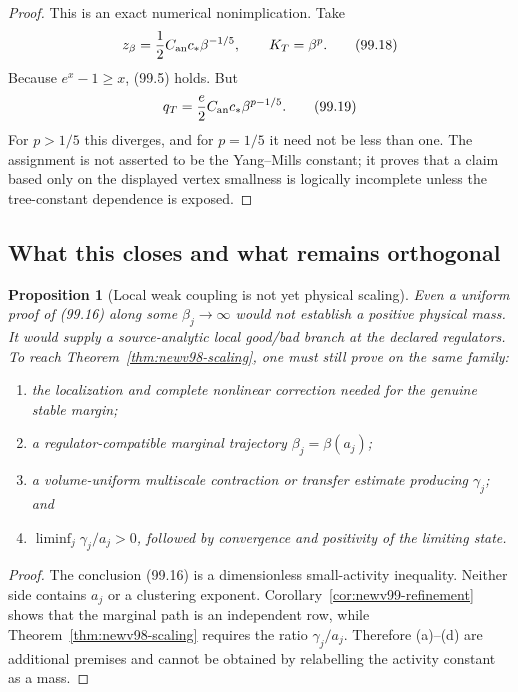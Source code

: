 \documentclass[11pt,oneside]{article}
\newtheorem{proposition}[theorem]{Proposition}
\theoremstyle{definition}
\theoremstyle{remark}
\begin{document}
\begin{proof}
This is an exact numerical nonimplication.  Take
\[
 z_\beta=\frac12C_{\rm an}c_*\beta^{-1/5},
 \qquad K_T=\beta^p.                                \tag{99.18}
\]
Because \(e^x-1\ge x\), (99.5) holds.  But
\[
 q_T=\frac e2C_{\rm an}c_*\beta^{p-1/5}.            \tag{99.19}
\]
For \(p>1/5\) this diverges, and for \(p=1/5\) it need not be less
than one.  The assignment is not asserted to be the Yang--Mills
constant; it proves that a claim based only on the displayed
vertex smallness is logically incomplete unless the tree-constant
dependence is exposed.
\end{proof}

\subsection{What this closes and what remains orthogonal}

\begin{proposition}[Local weak coupling is not yet physical scaling]
\label{prop:newv99-orthogonal}
Even a uniform proof of (99.16) along some
\(\beta_j\to\infty\) would not establish a positive physical mass.
It would supply a source-analytic local good/bad branch at the
declared regulators.  To reach Theorem~\ref{thm:newv98-scaling},
one must still prove on the same family:
\begin{enumerate}[label=\textup{(\alph*)},leftmargin=3.2em]
\item the localization and complete nonlinear correction needed
      for the genuine stable margin;
\item a regulator-compatible marginal trajectory
      \(\beta_j=\beta(a_j)\);
\item a volume-uniform multiscale contraction or transfer estimate
      producing \(\gamma_j\); and
\item \(\liminf_j\gamma_j/a_j>0\), followed by convergence and
      positivity of the limiting state.
\end{enumerate}
\end{proposition}

\begin{proof}
The conclusion (99.16) is a dimensionless small-activity
inequality.  Neither side contains \(a_j\) or a clustering exponent.
Corollary~\ref{cor:newv99-refinement} shows that the marginal path is
an independent row, while Theorem~\ref{thm:newv98-scaling} requires
the ratio \(\gamma_j/a_j\).  Therefore (a)--(d) are additional
premises and cannot be obtained by relabelling the activity
constant as a mass.
\end{proof}
\end{document}
